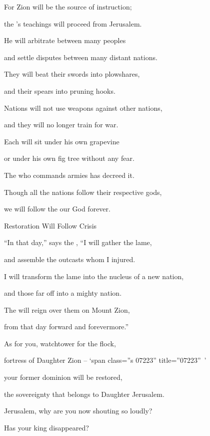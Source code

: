 {\par }{\Q For
Zion
will be the source
of instruction;
\par }{\Q the
{}’s
teachings
will proceed from
Jerusalem.
\par }{\Q {}He will arbitrate
between
many
peoples
\par }{\Q and settle
disputes
between many distant
nations.
\par }{\Q They will beat
their swords
into plowshares,
\par }{\Q and their spears
into pruning hooks.
\par }{\Q Nations
will not
use
weapons
against
other nations,
\par }{\Q and they will no
longer
train
for war.
\par }{\Q {}Each
will sit
under
his own grapevine
\par }{\Q or under
his own fig tree
without
any fear.
\par }{\Q The
{}
who commands armies
has decreed it.
\par }{\Q {}Though
all
the nations
follow
their respective gods,
\par }{\Q we
will follow
the {}
our God
forever.
\par }{\SH Restoration Will Follow Crisis
\par }{\Q {}“In that day,”
says
the {}, “I will gather
the lame,
\par }{\Q and assemble
the outcasts
whom
I injured.
\par }{\Q {}I
will transform
the
lame
into the nucleus
of a new nation,
\par }{\Q and those
far off into a mighty
nation.
\par }{\Q The
{}
will reign
over them on
Mount
Zion,
\par }{\Q from
that day forward
and forevermore.”
\par }{\Q {}As for you,
watchtower
for the flock,
\par }{\Q fortress
of Daughter
Zion – ‘span class=”s 07223” title=”07223” ’
\par }{\Q your former
dominion
will be restored,
\par }{\PP \par }{\Q the sovereignty
that belongs to Daughter
Jerusalem.
\par }{\Q {}Jerusalem, why
are you now
shouting
so loudly?

\par }{\Q Has your king
disappeared?

}
